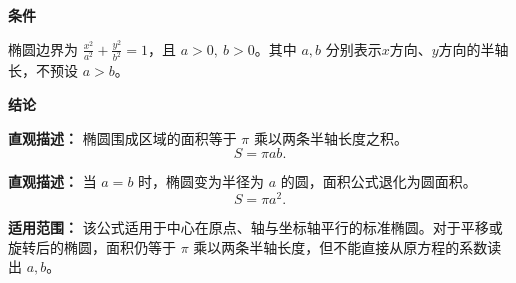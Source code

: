 \begin{statementbox}
\textbf{\textcolor{CStatement}{条件}}
\begin{description}[style=nextline, leftmargin=2.8em, labelsep=0.5em, itemsep=0.35em]
    \item[\textbf{\textcolor{CStatement}{条件1（标准椭圆方程）：}}] 椭圆边界为
    $\frac{x^2}{a^2}+\frac{y^2}{b^2}=1$，且 $a>0,\ b>0$。其中 $a,b$ 分别表示$x$方向、$y$方向的半轴长，不预设 $a>b$。
\end{description}

\textbf{\textcolor{CStatement}{结论}}
\begin{description}[style=nextline, leftmargin=2.8em, labelsep=0.5em, itemsep=0.45em]
    \item[\textbf{\textcolor{CStatement}{结论一（椭圆面积公式）：}}]
    \textbf{\textcolor{CStatement}{直观描述：}} 椭圆围成区域的面积等于 $\pi$ 乘以两条半轴长度之积。
    \[
    S = \pi ab.
    \]

    \item[\textbf{\textcolor{CStatement}{推广结论（圆为特例）：}}]
    \textbf{\textcolor{CStatement}{直观描述：}} 当 $a=b$ 时，椭圆变为半径为 $a$ 的圆，面积公式退化为圆面积。
    \[
    S = \pi a^2.
    \]
\end{description}

\textbf{\textcolor{CStatement}{适用范围：}} 该公式适用于中心在原点、轴与坐标轴平行的标准椭圆。对于平移或旋转后的椭圆，面积仍等于 $\pi$ 乘以两条半轴长度，但不能直接从原方程的系数读出 $a,b$。
\end{statementbox}
